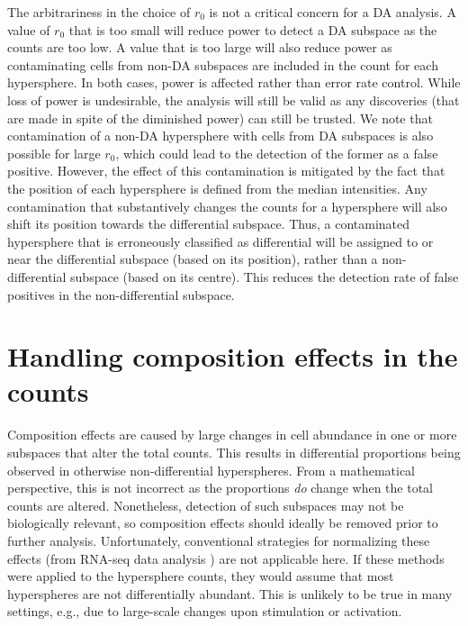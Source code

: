 \documentclass{article}
\begin{document}
The arbitrariness in the choice of $r_0$ is not a critical concern for a DA analysis.
A value of $r_0$ that is too small will reduce power to detect a DA subspace as the counts are too low.
A value that is too large will also reduce power as contaminating cells from non-DA subspaces are included in the count for each hypersphere.
In both cases, power is affected rather than error rate control.
While loss of power is undesirable, the analysis will still be valid as any discoveries (that are made in spite of the diminished power) can still be trusted.
We note that contamination of a non-DA hypersphere with cells from DA subspaces is also possible for large $r_0$, which could lead to the detection of the former as a false positive.
However, the effect of this contamination is mitigated by the fact that the position of each hypersphere is defined from the median intensities.
Any contamination that substantively changes the counts for a hypersphere will also shift its position towards the differential subspace.
Thus, a contaminated hypersphere that is erroneously classified as differential will be assigned to or near the differential subspace (based on its position), rather than a non-differential subspace (based on its centre).
This reduces the detection rate of false positives in the non-differential subspace.

\section{Handling composition effects in the counts}
Composition effects are caused by large changes in cell abundance in one or more subspaces that alter the total counts.
This results in differential proportions being observed in otherwise non-differential hyperspheres.
From a mathematical perspective, this is not incorrect as the proportions \textit{do} change when the total counts are altered.
Nonetheless, detection of such subspaces may not be biologically relevant, so composition effects should ideally be removed prior to further analysis.
Unfortunately, conventional strategies for normalizing these effects (from RNA-seq data analysis \cite{robinson2010scaling}) are not applicable here.
If these methods were applied to the hypersphere counts, they would assume that most hyperspheres are not differentially abundant.
This is unlikely to be true in many settings, e.g., due to large-scale changes upon stimulation or activation.
\end{document}
